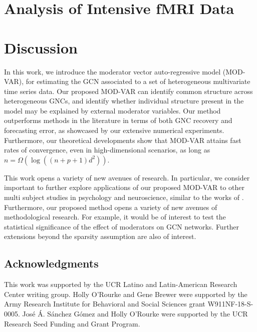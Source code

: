 	

\section{Analysis of Intensive fMRI Data}\label{section:realData}





\section{Discussion}\label{section:discussion}

In this work, we introduce the moderator vector auto-regressive model (MOD-VAR), for estimating the GCN associated to a set of heterogeneous multivariate time series data. Our proposed MOD-VAR can identify common structure across heterogeneous GNCs, and identify whether individual structure present in the model may be explained by external moderator variables. Our method outperforms methods in the literature in terms of both GNC recovery and forecasting error, as showcased by our extensive numerical experiments. Furthermore, our theoretical developments show that MOD-VAR attains fast rates of convergence, even in high-dimensional scenarios, as long as  $n = \Omega(\log((n+p+1) d^2))$. 

This work opens a variety of new avenues of research. In particular, we consider important to further explore applications of our proposed MOD-VAR to other multi subject studies in psychology and neuroscience, similar to the works of \citep{kim2007unified,rogers2007assessing,deshpande2009multivariate}. Furthermore, our proposed method opens a variety of new avenues of methodological research. For example, it would be of interest to test the statistical significance of the effect of moderators on GCN networks. Further extensions beyond the sparsity assumption are also of interest.


\vspace{-3mm}
\subsection*{Acknowledgments}
\vspace{-3mm}

This work was supported by the UCR Latino and Latin-American Research Center writing group. Holly O'Rourke and Gene Brewer were supported by the Army Research Institute for Behavioral and Social Sciences grant W911NF-18-S-0005. José Á. Sánchez Gómez and Holly O'Rourke were supported by the UCR Research Seed Funding and Grant Program.

